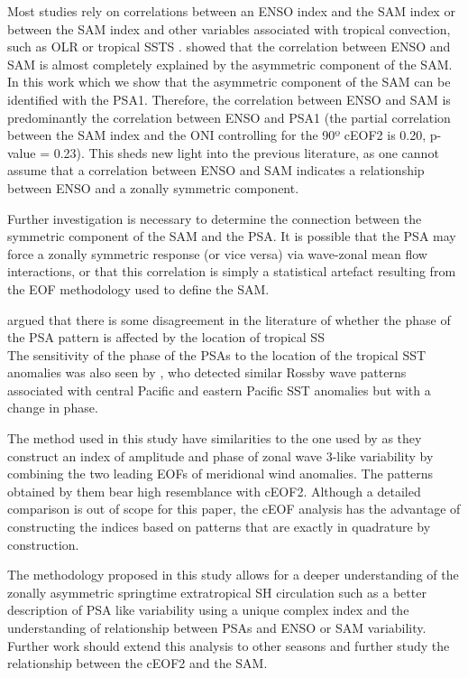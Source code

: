 \documentclass[pdflatex,sn-basic]{sn-jnl}
\theoremstyle{thmstyleone}%
\theoremstyle{thmstyletwo}%
\theoremstyle{thmstylethree}%
\begin{document}
Most studies rely on correlations between an ENSO index and the SAM index \citep[e.g.][\citet{cai2011a}]{lheureux2006} or between the SAM index and other variables associated with tropical convection, such as OLR or tropical SSTS \citep[e.g.][]{carvalho2005}.
\citet{campitelli2022} showed that the correlation between ENSO and SAM is almost completely explained by the asymmetric component of the SAM.
In this work which we show that the asymmetric component of the SAM can be identified with the PSA1.
Therefore, the correlation between ENSO and SAM is predominantly the correlation between ENSO and PSA1 (the partial correlation between the SAM index and the ONI controlling for the 90º cEOF2 is 0.20, p-value = 0.23).
This sheds new light into the previous literature, as one cannot assume that a correlation between ENSO and SAM indicates a relationship between ENSO and a zonally symmetric component.

Further investigation is necessary to determine the connection between the symmetric component of the SAM and the PSA.
It is possible that the PSA may force a zonally symmetric response (or vice versa) via wave-zonal mean flow interactions, or that this correlation is simply a statistical artefact resulting from the EOF methodology used to define the SAM.

\citet{irving2016} argued that there is some disagreement in the literature of whether the phase of the PSA pattern is affected by the location of tropical SS\\
The sensitivity of the phase of the PSAs to the location of the tropical SST anomalies was also seen by \citet{ciasto2015}, who detected similar Rossby wave patterns associated with central Pacific and eastern Pacific SST anomalies but with a change in phase.

The method used in this study have similarities to the one used by \citet{goyal2022} as they construct an index of amplitude and phase of zonal wave 3-like variability by combining the two leading EOFs of meridional wind anomalies.
The patterns obtained by them bear high resemblance with cEOF2.
Although a detailed comparison is out of scope for this paper, the cEOF analysis has the advantage of constructing the indices based on patterns that are exactly in quadrature by construction.

The methodology proposed in this study allows for a deeper understanding of the zonally asymmetric springtime extratropical SH circulation such as a better description of PSA like variability using a unique complex index and the understanding of relationship between PSAs and ENSO or SAM variability.
Further work should extend this analysis to other seasons and further study the relationship between the cEOF2 and the SAM.
\end{document}

